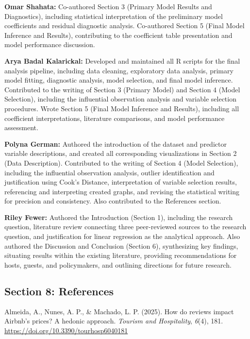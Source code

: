 \documentclass[
]{article}
\begin{document}
\textbf{Omar Shahata:} Co-authored Section 3 (Primary Model Results and
Diagnostics), including statistical interpretation of the preliminary
model coefficients and residual diagnostic analysis. Co-authored Section
5 (Final Model Inference and Results), contributing to the coefficient
table presentation and model performance discussion.

\textbf{Arya Badal Kalarickal:} Developed and maintained all R scripts
for the final analysis pipeline, including data cleaning, exploratory
data analysis, primary model fitting, diagnostic analysis, model
selection, and final model inference. Contributed to the writing of
Section 3 (Primary Model) and Section 4 (Model Selection), including the
influential observation analysis and variable selection procedures.
Wrote Section 5 (Final Model Inference and Results), including all
coefficient interpretations, literature comparisons, and model
performance assessment.

\textbf{Polyna German:} Authored the introduction of the dataset and
predictor variable descriptions, and created all corresponding
visualizations in Section 2 (Data Description). Contributed to the
writing of Section 4 (Model Selection), including the influential
observation analysis, outlier identification and justification using
Cook's Distance, interpretation of variable selection results,
referencing and interpreting created graphs, and revising the
statistical writing for precision and consistency. Also contributed to
the References section.

\textbf{Riley Fewer:} Authored the Introduction (Section 1), including
the research question, literature review connecting three peer-reviewed
sources to the research question, and justification for linear
regression as the analytical approach. Also authored the Discussion and
Conclusion (Section 6), synthesizing key findings, situating results
within the existing literature, providing recommendations for hosts,
guests, and policymakers, and outlining directions for future research.

\subsection{Section 8: References}\label{section-8-references}

Almeida, A., Nunes, A. P., \& Machado, L. P. (2025). How do reviews
impact Airbnb's prices? A hedonic approach. \emph{Tourism and
Hospitality}, \emph{6}(4), 181.
\url{https://doi.org/10.3390/tourhosp6040181}
\end{document}
